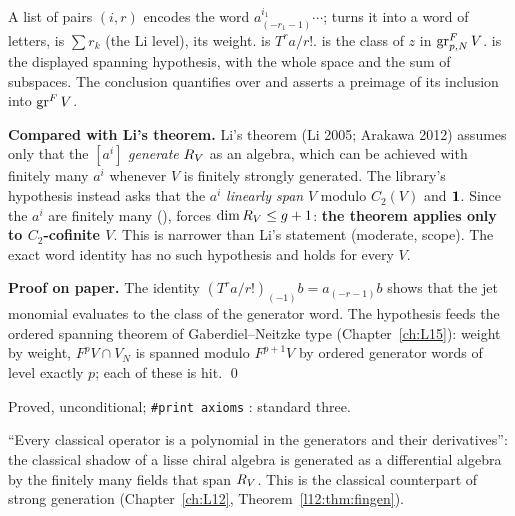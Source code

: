 \begin{dictionary}
A list  of pairs $(i,r)$ encodes the word $a^{i_1}_{(-r_1-1)}\cdots$; 
turns it into a word of letters,  is $\sum r_k$ (the Li level),  its weight.
 is $T^ra/r!$.  is the class of $z$ in
$\operatorname{gr}^F_{p,N}V$.  is the displayed spanning hypothesis, with  the whole space and
 the sum of subspaces. The conclusion quantifies over  and asserts a
preimage  of its inclusion \allowbreak{} into $\operatorname{gr}^FV$.

\textbf{Compared with Li's theorem.} Li's theorem (Li 2005; Arakawa 2012) assumes only that
the $[a^i]$ \emph{generate} $R_V$ as an algebra, which can be achieved with finitely many $a^i$ whenever $V$
is finitely strongly generated. The library's hypothesis  instead asks that the $a^i$ \emph{linearly
span} $V$ modulo $C_2(V)$ and $\mathbf{1}$. Since the $a^i$ are finitely many (),  forces
$\dim R_V\le g+1$: \textbf{the theorem applies only to $C_2$-cofinite $V$}. This is narrower than Li's
statement (moderate, scope). The exact word identity \allowbreak{}\allowbreak{}\allowbreak{}\allowbreak{}
has no such hypothesis and holds for every $V$.
\end{dictionary}

\textbf{Proof on paper.} The identity $(T^ra/r!)_{(-1)}b = a_{(-r-1)}b$ shows that the jet monomial evaluates to
the class of the generator word. The hypothesis  feeds the ordered spanning theorem of
Gaberdiel--Neitzke type (Chapter~\ref{ch:L15}): weight by weight, $F^pV\cap V_N$ is spanned modulo $F^{p+1}V$ by
ordered generator words of level exactly $p$; each of these is hit. \qed

\begin{status}
Proved, unconditional; \texttt{\#print axioms} \allowbreak{}\allowbreak{}\allowbreak{}\allowbreak{}\allowbreak{}\allowbreak{}:
standard three.
\end{status}

\begin{physics}
``Every classical operator is a polynomial in the generators and their derivatives'': the classical shadow of a
lisse chiral algebra is generated as a differential algebra by the finitely many fields that span $R_V$. This
is the classical counterpart of strong generation (Chapter~\ref{ch:L12}, Theorem~\ref{l12:thm:fingen}).
\end{physics}

